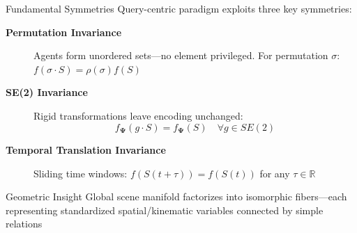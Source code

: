 \documentclass[10pt,aspectratio=169]{beamer}
\begin{document}
\begin{frame}{Fundamental Symmetries}
Query-centric paradigm exploits three key symmetries:

\vspace{0.3cm}

\begin{description}
\item[\textbf{Permutation Invariance}]
Agents form unordered sets—no element privileged. For permutation $\sigma$: $f(\sigma \cdot S) = \rho(\sigma) f(S)$

\item[\textbf{SE(2) Invariance}]
Rigid transformations leave encoding unchanged:
\begin{equation}
f_{\boldsymbol{\Psi}}(g \cdot S) = f_{\boldsymbol{\Psi}}(S) \quad \forall g \in SE(2)
\end{equation}

\item[\textbf{Temporal Translation Invariance}]
Sliding time windows: $f(S(t+\tau)) = f(S(t))$ for any $\tau \in \mathbb{R}$
\end{description}

\begin{block}{Geometric Insight}
Global scene manifold factorizes into isomorphic fibers—each representing standardized spatial/kinematic variables connected by simple relations
\end{block}
\end{frame}
\end{document}
